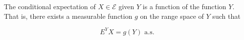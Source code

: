 The conditional expectation of $X \in \mathcal{E}$ given $Y$ is a function of the function $Y$. That is, there exists a measurable function $g$ on the range space of $Y$ such that

$$E^Y X = g(Y) \text{ a.s.}$$
